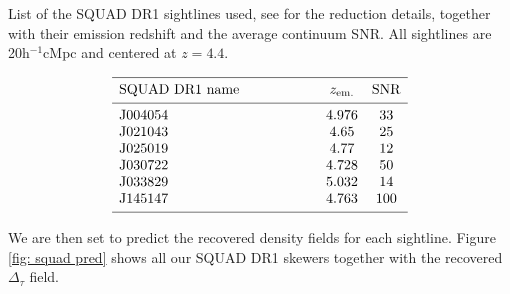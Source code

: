 \begin{table}
    \caption[]{List of the SQUAD DR1 sightlines used, see \cite{Murphy_2018} for the reduction details, together with their emission redshift and the average continuum SNR.     
    All sightlines are 20h$^{-1}$cMpc and centered at $z=4.4$.}
    \label{tab: squad dr1}
   $$ 
       \begin{array}{p{0.4\linewidth}cc}
          \hline
          \noalign{\smallskip}
          SQUAD DR1 name &  z_{\mathrm{em.}} & \mathrm{SNR} \\ 
          \noalign{\smallskip}
          \hline
          \noalign{\smallskip}
          J004054 &4.976  & 33    \\
          J021043           &4.65   &25\\
          J025019     &4.77   &     12      \\
          J030722     &4.728        &   50          \\
          J033829 &  5.032             &  14         \\
          J145147  & 4.763                 &  100         \\
          \noalign{\smallskip}
          \hline
       \end{array}
   $$ 
 \end{table}


We are then set to predict the recovered density fields for each sightline. Figure \ref{fig: squad pred} shows all our SQUAD DR1 skewers together with the recovered $\Delta_\tau$ field.

